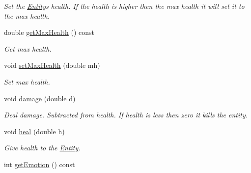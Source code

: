 \begin{DoxyCompactItemize}
\begin{DoxyCompactList}\small\item\em Set the \hyperlink{classEntity}{Entity}\textquotesingle{}s health. If the health is higher then the max health it will set it to the max health. \end{DoxyCompactList}\item 
double \hyperlink{classEntity_a5db2ad1ad9e13953207fec9786e632ca}{get\+Max\+Health} () const \hypertarget{classEntity_a5db2ad1ad9e13953207fec9786e632ca}{}\label{classEntity_a5db2ad1ad9e13953207fec9786e632ca}

\begin{DoxyCompactList}\small\item\em Get max health. \end{DoxyCompactList}\item 
void \hyperlink{classEntity_a375385b808ac7fd4632d6b71f15b0e1c}{set\+Max\+Health} (double mh)\hypertarget{classEntity_a375385b808ac7fd4632d6b71f15b0e1c}{}\label{classEntity_a375385b808ac7fd4632d6b71f15b0e1c}

\begin{DoxyCompactList}\small\item\em Set max health. \end{DoxyCompactList}\item 
void \hyperlink{classEntity_af7fb432e778f9fcfe4584d09b6a73294}{damage} (double d)\hypertarget{classEntity_af7fb432e778f9fcfe4584d09b6a73294}{}\label{classEntity_af7fb432e778f9fcfe4584d09b6a73294}

\begin{DoxyCompactList}\small\item\em Deal damage. Subtracted from health. If health is less then zero it kills the entity. \end{DoxyCompactList}\item 
void \hyperlink{classEntity_aef00fa78f66829c0ecb8c27c65bd3a92}{heal} (double h)\hypertarget{classEntity_aef00fa78f66829c0ecb8c27c65bd3a92}{}\label{classEntity_aef00fa78f66829c0ecb8c27c65bd3a92}

\begin{DoxyCompactList}\small\item\em Give health to the \hyperlink{classEntity}{Entity}. \end{DoxyCompactList}\item 
int \hyperlink{classEntity_af1e50595c209b7c90fc9e98ce93883d4}{get\+Emotion} () const \hypertarget{classEntity_af1e50595c209b7c90fc9e98ce93883d4}{}\label{classEntity_af1e50595c209b7c90fc9e98ce93883d4}


\end{DoxyCompactItemize}
